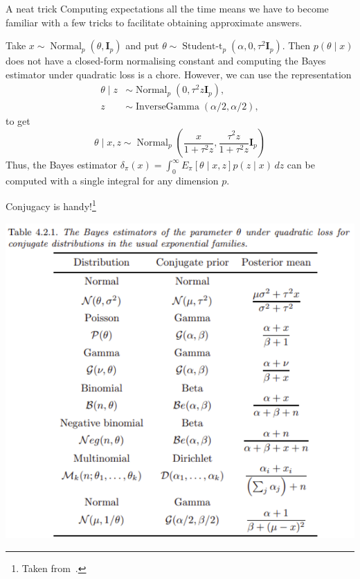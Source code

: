 \begin{frame}{A neat trick}
Computing expectations all the time means we have to become familiar with a few tricks to facilitate obtaining approximate answers.
\begin{example}
Take $x \sim \operatorname{Normal}_p(\theta, \boldsymbol{I}_p)$ and put $\theta \sim \operatorname{Student-t}_p(\alpha, 0, \tau^2\boldsymbol{I}_p)$.
Then $p(\theta \mid x)$ does not have a closed-form normalising constant and computing the Bayes estimator under quadratic loss is a chore.
However, we can use the representation
\begin{align*}
 \theta \mid z &\sim \operatorname{Normal}_p(0, \tau^2z\boldsymbol{I}_p),\\
 z & \sim \operatorname{InverseGamma}(\alpha/2, \alpha/2),
\end{align*}
to get 
$$ \theta \mid x, z \sim  \operatorname{Normal}_p\left(\frac{x}{ 1+ \tau^2z}, \frac{\tau^2z}{ 1+ \tau^2z}\boldsymbol{I}_p\right) $$ 
Thus, the Bayes estimator $\delta_\pi(x) = \int_0^\infty E_\pi[\theta \mid x, z]p(z \mid x)\,dz$ can be computed with a single integral for any dimension $p$. 
\end{example} 
\end{frame}
\begin{frame}{Conjugacy is handy!\footnote{Taken from~\cite{Robert2007}.}}
\begin{center}
 \includegraphics[scale=0.5]{figures/conjugate_table_expectations.pdf}
\end{center}
\end{frame}
